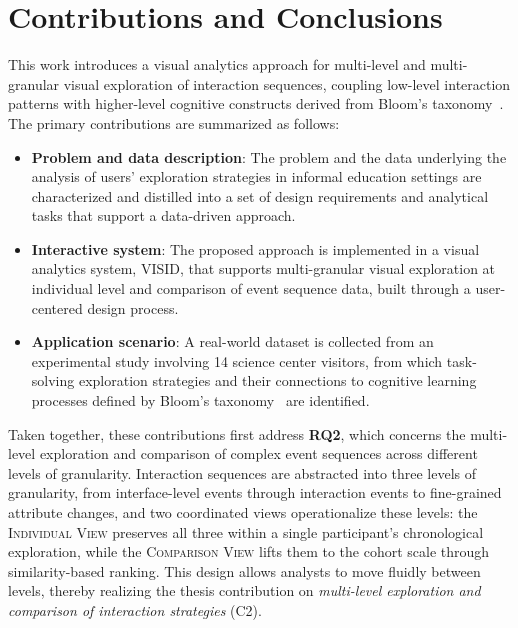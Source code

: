 \section{Contributions and Conclusions}

This work introduces a visual analytics approach for multi-level and multi-granular visual exploration of interaction sequences, coupling low-level interaction patterns with higher-level cognitive constructs derived from Bloom's taxonomy~\cite{anderson2001taxonomy, bloom1956taxonomy}.
The primary contributions are summarized as follows:
\begin{itemize}
    \item
    \textbf{Problem and data description}:
    The problem and the data underlying the analysis of users' exploration strategies in informal education settings are characterized and distilled into a set of design requirements and analytical tasks that support a data-driven approach.

    \item
    \textbf{Interactive system}:
    The proposed approach is implemented in a visual analytics system, \textsc{VISID}, that supports multi-granular visual exploration at individual level and comparison of event sequence data, built through a user-centered design process.

    \item
    \textbf{Application scenario}:
    A real-world dataset is collected from an experimental study involving 14 science center visitors, from which task-solving exploration strategies and their connections to cognitive learning processes defined by Bloom's taxonomy~\cite{anderson2001taxonomy, bloom1956taxonomy} are identified.
\end{itemize}

Taken together, these contributions first address \textbf{RQ2}, which concerns the multi-level exploration and comparison of complex event sequences across different levels of granularity.
Interaction sequences are abstracted into three levels of granularity, from interface-level events through interaction events to fine-grained attribute changes, and two coordinated views operationalize these levels: the \textsc{Individual View} preserves all three within a single participant's chronological exploration, while the \textsc{Comparison View} lifts them to the cohort scale through similarity-based ranking.
This design allows analysts to move fluidly between levels, thereby realizing the thesis contribution on \textit{multi-level exploration and comparison of interaction strategies} (C2).


